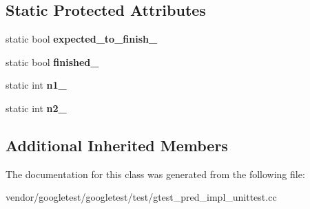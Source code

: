 \subsection*{Static Protected Attributes}
\begin{DoxyCompactItemize}
\item 
\mbox{\label{class_predicate2_test_a56cf1f0f556addd9a62e0644dc1a86fc}} 
static bool {\bfseries expected\+\_\+to\+\_\+finish\+\_\+}
\item 
\mbox{\label{class_predicate2_test_a30f4ef76d3004253078e767e5c653b85}} 
static bool {\bfseries finished\+\_\+}
\item 
\mbox{\label{class_predicate2_test_ac002d8e279b24e75906fd19973fc2170}} 
static int {\bfseries n1\+\_\+}
\item 
\mbox{\label{class_predicate2_test_a9dbe5173570b9b911af2df889c287027}} 
static int {\bfseries n2\+\_\+}
\end{DoxyCompactItemize}
\subsection*{Additional Inherited Members}


The documentation for this class was generated from the following file\+:\begin{DoxyCompactItemize}
\item 
vendor/googletest/googletest/test/gtest\+\_\+pred\+\_\+impl\+\_\+unittest.\+cc\end{DoxyCompactItemize}
